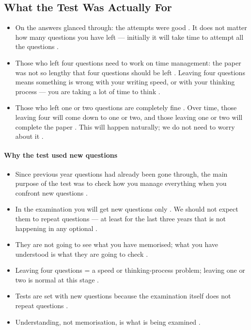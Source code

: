 \subsection{What the Test Was Actually For}
\begin{itemize}
    \item On the answers glanced through: the attempts were good . It does not matter how many questions you have left --- initially it will take time to attempt all the questions .
    \item Those who left four questions need to work on time management: the paper was not so lengthy that four questions should be left . Leaving four questions means something is wrong with your writing speed, or with your thinking process --- you are taking a lot of time to think .
    \item Those who left one or two questions are completely fine . Over time, those leaving four will come down to one or two, and those leaving one or two will complete the paper . This will happen naturally; we do not need to worry about it .
\end{itemize}

\paragraph{Why the test used new questions}
\begin{itemize}
    \item Since previous year questions had already been gone through, the main purpose of the test was to check how you manage everything when you confront new questions .
    \item In the examination you will get new questions only . We should not expect them to repeat questions --- at least for the last three years that is not happening in any optional .
    \item They are not going to see what you have memorised; what you have understood is what they are going to check .
\end{itemize}

\begin{QuickRevision}
\begin{itemize}
    \item Leaving four questions = a speed or thinking-process problem; leaving one or two is normal at this stage .
    \item Tests are set with new questions because the examination itself does not repeat questions .
    \item Understanding, not memorisation, is what is being examined .
\end{itemize}
\end{QuickRevision}

